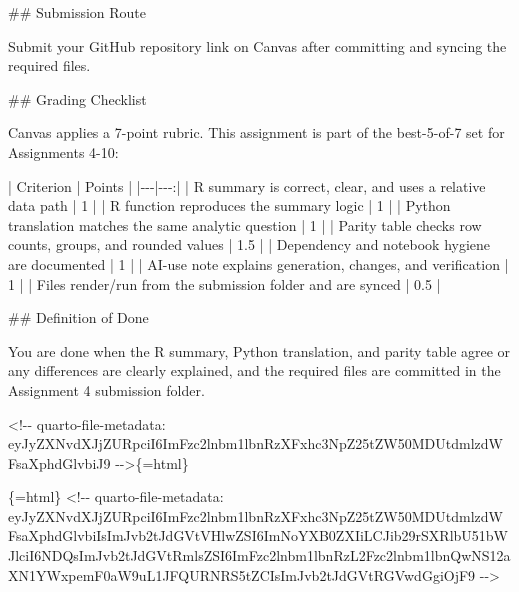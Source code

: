 \documentclass[
  letterpaper,
  DIV=11,
  numbers=noendperiod,
  oneside]{scrreprt}
\newenvironment{Shaded}{\begin{snugshade}}{\end{snugshade}}
\newcommand{\FunctionTok}[1]{\textcolor[rgb]{0.28,0.35,0.67}{#1}}
\newcommand{\InformationTok}[1]{\textcolor[rgb]{0.37,0.37,0.37}{#1}}
\newcommand{\NormalTok}[1]{\textcolor[rgb]{0.00,0.23,0.31}{#1}}
\newcommand{\PreprocessorTok}[1]{\textcolor[rgb]{0.68,0.00,0.00}{#1}}
\begin{document}
\begin{Shaded}
\begin{Highlighting}[numbers=left,,]
\FunctionTok{\#\# Submission Route}

\NormalTok{Submit your GitHub repository link on Canvas after committing and syncing the required files.}

\FunctionTok{\#\# Grading Checklist}

\NormalTok{Canvas applies a 7{-}point rubric. This assignment is part of the best{-}5{-}of{-}7 set for Assignments 4{-}10:}

\PreprocessorTok{|}\NormalTok{ Criterion }\PreprocessorTok{|}\NormalTok{ Points }\PreprocessorTok{|}
\PreprocessorTok{|{-}{-}{-}|{-}{-}{-}:|}
\PreprocessorTok{|}\NormalTok{ R summary is correct, clear, and uses a relative data path }\PreprocessorTok{|}\NormalTok{ 1 }\PreprocessorTok{|}
\PreprocessorTok{|}\NormalTok{ R function reproduces the summary logic }\PreprocessorTok{|}\NormalTok{ 1 }\PreprocessorTok{|}
\PreprocessorTok{|}\NormalTok{ Python translation matches the same analytic question }\PreprocessorTok{|}\NormalTok{ 1 }\PreprocessorTok{|}
\PreprocessorTok{|}\NormalTok{ Parity table checks row counts, groups, and rounded values }\PreprocessorTok{|}\NormalTok{ 1.5 }\PreprocessorTok{|}
\PreprocessorTok{|}\NormalTok{ Dependency and notebook hygiene are documented }\PreprocessorTok{|}\NormalTok{ 1 }\PreprocessorTok{|}
\PreprocessorTok{|}\NormalTok{ AI{-}use note explains generation, changes, and verification }\PreprocessorTok{|}\NormalTok{ 1 }\PreprocessorTok{|}
\PreprocessorTok{|}\NormalTok{ Files render/run from the submission folder and are synced }\PreprocessorTok{|}\NormalTok{ 0.5 }\PreprocessorTok{|}

\FunctionTok{\#\# Definition of Done}

\NormalTok{You are done when the R summary, Python translation, and parity table agree or any differences are clearly explained, and the required files are committed in the Assignment 4 submission folder.}


\InformationTok{\textasciigrave{}\textless{}!{-}{-} quarto{-}file{-}metadata: eyJyZXNvdXJjZURpciI6ImFzc2lnbm1lbnRzXFxhc3NpZ25tZW50MDUtdmlzdWFsaXphdGlvbiJ9 {-}{-}\textgreater{}\textasciigrave{}}\NormalTok{\{=html\}}

\InformationTok{\textasciigrave{}\textasciigrave{}\textasciigrave{}\{=html\}}
\InformationTok{\textless{}!{-}{-} quarto{-}file{-}metadata: eyJyZXNvdXJjZURpciI6ImFzc2lnbm1lbnRzXFxhc3NpZ25tZW50MDUtdmlzdWFsaXphdGlvbiIsImJvb2tJdGVtVHlwZSI6ImNoYXB0ZXIiLCJib29rSXRlbU51bWJlciI6NDQsImJvb2tJdGVtRmlsZSI6ImFzc2lnbm1lbnRzL2Fzc2lnbm1lbnQwNS12aXN1YWxpemF0aW9uL1JFQURNRS5tZCIsImJvb2tJdGVtRGVwdGgiOjF9 {-}{-}\textgreater{}}
\InformationTok{\textasciigrave{}\textasciigrave{}\textasciigrave{}}


\end{Highlighting}
\end{Shaded}
\end{document}
